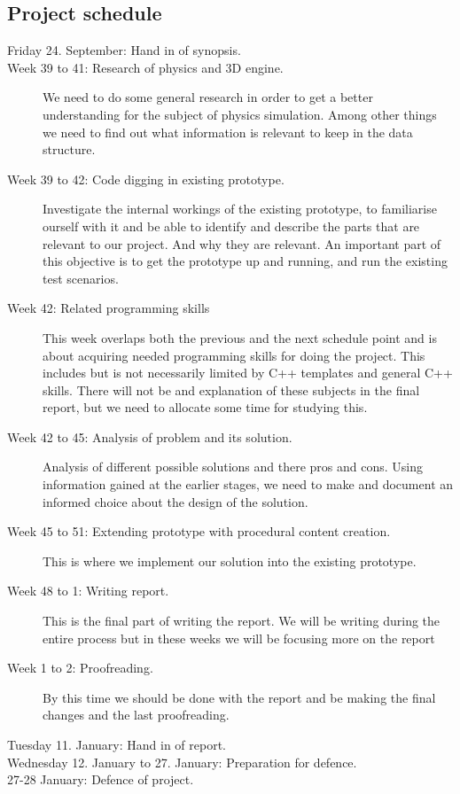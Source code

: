 \documentclass[a4paper, 10pt]{article}
\begin{document}
\subsection*{Project schedule}
\begin{description}
\item[Friday 24. September: Hand in of synopsis.]
\item[Week 39 to 41: Research of physics and 3D engine.] We need to do some general research in order to get a better
							understanding for the subject of physics simulation. 
							Among other things we need to find out what information is relevant to keep in the
							data structure. 

\item[Week 39 to 42: Code digging in existing prototype.]Investigate the internal workings of the existing prototype, to familiarise ourself 
							with it and be able to identify and describe 
							the parts that are relevant to our project. And why they are relevant.
							An important part of this objective is to get the prototype up and running, 
							and run the existing test scenarios.
\item[Week 42: Related programming skills] This week overlaps both the previous and the next schedule point and is about acquiring needed 
					   programming skills for doing the project. This includes but is not necessarily limited by C++ 
					   templates and general C++ skills. There will not be and explanation of these subjects in the 
					   final report, but we need to allocate some time for studying this.

\item[Week 42 to 45: Analysis of problem and its solution.] Analysis of different possible solutions and there pros and cons. Using information
							    gained at the earlier stages, we need to make and document an informed choice 
							    about the design of the solution.

\item[Week 45 to 51: Extending prototype with procedural content creation.] 	This is where we implement our solution into
										the existing prototype.

\item[Week 48 to 1: Writing report.]
							This is the final part of writing the report. 
							We will be writing during the entire process but in these weeks we will be
							focusing more on the report

\item[Week 1 to 2:  Proofreading.]			By this time we should be done with the report and be 
							making the final changes and the last proofreading.
\item[Tuesday 11. January: Hand in of report.]
\item[Wednesday 12. January to 27. January: Preparation for defence.]
\item[27-28 January: Defence of project.]
\end{description}
\end{document}
